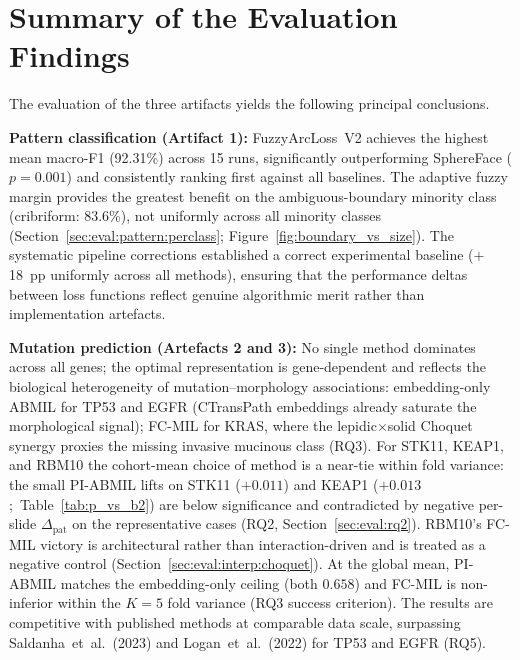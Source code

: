 \section{Summary of the Evaluation Findings}
\label{sec:eval:summary}

The evaluation of the three artifacts yields the following principal
conclusions.

\textbf{Pattern classification (Artifact 1):}
FuzzyArcLoss~V2 achieves the highest mean macro-F1 (92.31\%) across 15 runs,
significantly outperforming SphereFace ($p = 0.001$) and consistently
ranking first against all baselines.
The adaptive fuzzy margin provides the greatest benefit on the
ambiguous-boundary minority class (cribriform: 83.6\%), not
uniformly across all minority classes
(Section~\ref{sec:eval:pattern:perclass};
Figure~\ref{fig:boundary_vs_size}).
The systematic pipeline corrections established a correct experimental
baseline ($+$18~pp uniformly across all methods), ensuring that the
performance deltas between loss functions reflect genuine algorithmic
merit rather than implementation artefacts.

\textbf{Mutation prediction (Artefacts 2 and 3):}
No single method dominates across all genes; the optimal
representation is gene-dependent and reflects the biological
heterogeneity of mutation--morphology associations:
embedding-only ABMIL for TP53 and EGFR (CTransPath embeddings
already saturate the morphological signal);
FC-MIL for KRAS, where the lepidic$\times$solid Choquet synergy
proxies the missing invasive mucinous class (RQ3).
For STK11, KEAP1, and RBM10 the cohort-mean choice of method is a
near-tie within fold variance: the small PI-ABMIL lifts on STK11
($+0.011$) and KEAP1 ($+0.013$;~Table~\ref{tab:p_vs_b2}) are
below significance and contradicted by negative per-slide
$\Delta_{\mathrm{pat}}$ on the representative cases
(RQ2, Section~\ref{sec:eval:rq2}).
RBM10's FC-MIL victory is architectural rather than
interaction-driven and is treated as a negative control
(Section~\ref{sec:eval:interp:choquet}).
At the global mean, PI-ABMIL matches the embedding-only ceiling
(both $0.658$) and FC-MIL is non-inferior within the $K=5$ fold
variance (RQ3 success criterion).
The results are competitive with published methods at comparable
data scale, surpassing Saldanha~et~al.\ (2023) and
Logan~et~al.\ (2022) for TP53 and EGFR (RQ5).

